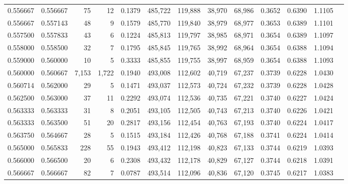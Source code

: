 \begin{tabular}{rrrrrrrrrrrrr}
0.556667 & 0.556667 &     75 &    12 &                                     0.1379 & 485,722 & 119,888 &  38,970 &  68,986 & 0.3652 & 0.6390 & 1.1105 \\
0.556667 & 0.557143 &     48 &     9 &                                     0.1579 & 485,770 & 119,840 &  38,979 &  68,977 & 0.3653 & 0.6389 & 1.1101 \\
0.557500 & 0.557833 &     43 &     6 &                                     0.1224 & 485,813 & 119,797 &  38,985 &  68,971 & 0.3654 & 0.6389 & 1.1097 \\
0.558000 & 0.558500 &     32 &     7 &                                     0.1795 & 485,845 & 119,765 &  38,992 &  68,964 & 0.3654 & 0.6388 & 1.1094 \\
0.559000 & 0.560000 &     10 &     5 &                                     0.3333 & 485,855 & 119,755 &  38,997 &  68,959 & 0.3654 & 0.6388 & 1.1093 \\
0.560000 & 0.560667 &  7,153 & 1,722 &                                     0.1940 & 493,008 & 112,602 &  40,719 &  67,237 & 0.3739 & 0.6228 & 1.0430 \\
0.560714 & 0.562000 &     29 &     5 &                                     0.1471 & 493,037 & 112,573 &  40,724 &  67,232 & 0.3739 & 0.6228 & 1.0428 \\
0.562500 & 0.563000 &     37 &    11 &                                     0.2292 & 493,074 & 112,536 &  40,735 &  67,221 & 0.3740 & 0.6227 & 1.0424 \\
0.563333 & 0.563333 &     31 &     8 &                                     0.2051 & 493,105 & 112,505 &  40,743 &  67,213 & 0.3740 & 0.6226 & 1.0421 \\
0.563333 & 0.563500 &     51 &    20 &                                     0.2817 & 493,156 & 112,454 &  40,763 &  67,193 & 0.3740 & 0.6224 & 1.0417 \\
0.563750 & 0.564667 &     28 &     5 &                                     0.1515 & 493,184 & 112,426 &  40,768 &  67,188 & 0.3741 & 0.6224 & 1.0414 \\
0.565000 & 0.565833 &    228 &    55 &                                     0.1943 & 493,412 & 112,198 &  40,823 &  67,133 & 0.3744 & 0.6219 & 1.0393 \\
0.566000 & 0.566500 &     20 &     6 &                                     0.2308 & 493,432 & 112,178 &  40,829 &  67,127 & 0.3744 & 0.6218 & 1.0391 \\
0.566667 & 0.566667 &     82 &     7 &                                     0.0787 & 493,514 & 112,096 &  40,836 &  67,120 & 0.3745 & 0.6217 & 1.0383 \\

\end{tabular}
